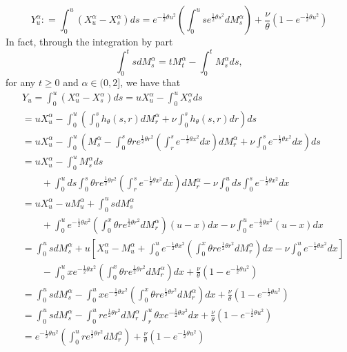 \documentclass[11pt]{amsart}
\theoremstyle{plain}
\numberwithin{equation}{section}
\begin{document}
\begin{equation}\label{sec2-eq12}
Y_u^\alpha: = \int_0^u (X_u^\alpha - X_s^\alpha)ds =  e^{-\frac{1}{2}\theta u^2} \left(\int_0^u se^{\frac{1}{2}\theta s^2}dM_s^\alpha \right) +\frac{\nu}{\theta}\left(1-e^{-\frac{1}{2}\theta u^2}\right)
\end{equation}
In fact, through the integration by part
\begin{equation*}
\int_0^t s dM_s^\alpha = tM_t^\alpha - \int_0^t M_s^\alpha ds,
\end{equation*}
for any $t \geq 0$ and $\alpha \in (0,2]$, we have that 
\begin{equation*}
\begin{aligned}
& Y_u =\int_0^u (X_u^\alpha - X_s^\alpha)ds = u X_u^\alpha -  \int_0^u X_s^\alpha ds\\
& = u X_u^\alpha -\int_0^u \left(\int_0^s h_\theta (s,r) dM_r^\alpha + \nu \int_0^s h_\theta (s,r) dr \right)ds\\
& =  u X_u^\alpha - \int_0^u \left(M_s^\alpha - \int_0^s \theta r e^{\frac{1}{2}\theta r^2 }\left(\int_r^s e^{-\frac{1}{2}\theta x^2 }dx \right) dM_r^\alpha +\nu \int_0^s e^{-\frac{1}{2}\theta x^2 }dx\right)ds\\
& =  u X_u^\alpha -\int_0^u M_s^\alpha ds\\
& \quad \quad +\int_0^u ds \int_0^s \theta r e^{\frac{1}{2}\theta r^2}\left(\int_r^s e^{-\frac{1}{2}\theta x^2}dx \right) dM_r^\alpha - \nu \int_0^u ds \int_0^s e^{-\frac{1}{2}\theta x^2}dx\\
& =  uX_u^\alpha - uM_u^\alpha + \int_0^u sdM_s^\alpha\\
& \quad \quad +\int_0^u e^{-\frac{1}{2}\theta x^2}\left(\int_0^x \theta r e^{\frac{1}{2}\theta r^2 }dM_r^\alpha \right)(u-x)dx -\nu \int_0^u e^{-\frac{1}{2}\theta x^2}(u-x)dx\\
& = \int_0^u s dM_s^\alpha +u \left[X_u^\alpha -M_u^\alpha + \int_0^u e^{-\frac{1}{2}\theta x^2}\left(\int_0^x \theta r e^{\frac{1}{2}\theta r^2}dM_r^\alpha \right)dx -\nu \int_0^u e^{-\frac{1}{2}\theta x^2}dx\right]\\
& \quad \quad - \int_0^u x e^{-\frac{1}{2}\theta x^2} \left(\int_0^x \theta r e^{\frac{1}{2}\theta r^2}dM_r^\alpha \right)dx + \frac{\nu}{\theta} \left(1 - e^{-\frac{1}{2}\theta u^2}\right)\\
& = \int_0^u s dM_s^\alpha - \int_0^u x e^{-\frac{1}{2}\theta x^2} \left(\int_0^x \theta r e^{\frac{1}{2}\theta r^2}dM_r^\alpha \right)dx + \frac{\nu}{\theta} \left(1 - e^{-\frac{1}{2}\theta u^2}\right) \\
& = \int_0^u s dM_s^\alpha  - \int_0^u r e^{\frac{1}{2}\theta r^2}dM_r^\alpha \int_r^u \theta x e^{-\frac{1}{2}\theta x^2} dx + \frac{\nu}{\theta}\left(1-e^{-\frac{1}{2}\theta u^2} \right)\\
& = e^{-\frac{1}{2}\theta u^2} \left(\int_0^u r e^{\frac{1}{2}\theta r^2}dM_r^\alpha  \right)+\frac{\nu}{\theta}\left(1-e^{-\frac{1}{2}\theta u^2} \right) \\
\end{aligned}
\end{equation*}
\end{document}
